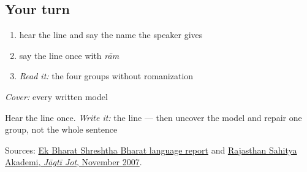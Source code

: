 \subsection*{Your turn}
\begin{enumerate}
\raggedright
  \item hear the line and say the name the speaker gives
  \item say the line once with \emph{rām}
  \item \emph{Read it:} the four groups without romanization
\end{enumerate}

\begin{tcolorbox}[breakable,colback=teal!4,colframe=teal!35!black,title={Before you move on}]
\emph{Cover:} every written model

Hear the line once. \emph{Write it:} the line — then uncover the model and repair one group, not the whole sentence

Sources: \href{https://www.rgmcet.edu.in/assets/img/documents/Campus\%20Life/Other\%20Reports.pdf}{Ek Bharat Shreshtha Bharat language report} and \href{https://rsad.artandculture.rajasthan.gov.in/content/dam/doitassets/art-and-culture/Rajasthani-Bhasha-Sahitya-Avm-Sanskriti-Academy-Bikaner/pdf/JJ\_All\_Pdf/JJ\_36\_08\_08\_November\_to\_November\_2007.pdf}{Rajasthan Sahitya Akademi, \emph{Jāgtī Jot}, November 2007}.
\end{tcolorbox}
